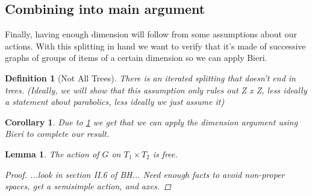 \documentclass{article}
\theoremstyle{mystyle}
\newtheorem{lem}{Lemma}[section]
\newtheorem{defn}{Definition}[section]
\newtheorem*{cor*}{Corollary}
\theoremstyle{remark}
\begin{document}
\subsection{Combining into main argument}

Finally, having enough dimension will follow from some assumptions about our actions.
With this splitting in hand we want to verify that it's made of successive graphs of groups of items of a certain dimension so we can apply Bieri.

\begin{defn}
    [Not All Trees]
    \label{def:notalltrees} 
    There is an iterated splitting that doesn't end in trees. (Ideally, we will show that this assumption only rules out Z x Z, less ideally a statement about parabolics, less ideally we just assume it)
\end{defn}

\begin{cor*}
    Due to \ref{def:notalltrees} we get that we can apply the dimension argument using Bieri to complete our result.
\end{cor*}

\begin{lem}
    The action of \(G\) on \(T_1 \times T_{2} \) is free.
    \begin{proof}
        ...look in section II.6 of BH... Need enough facts to avoid non-proper spaces, get a semisimple action, and axes.
    \end{proof}
\end{lem}
\end{document}
